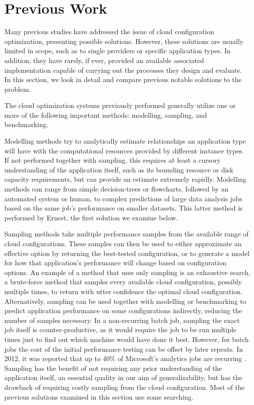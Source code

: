 \documentclass{report}
\begin{document}
\section{Previous Work}
Many previous studies have addressed the issue of cloud configuration optimization, presenting possible solutions. However, these solutions are usually limited in scope, such as to single providers or specific application types. In addition, they have rarely, if ever, provided an available associated implementation capable of carrying out the processes they design and evaluate. In this section, we look in detail and compare previous notable solutions to the problem.

The cloud optimization systems previously performed generally utilize one or more of the following important methods: modelling, sampling, and benchmarking. 

Modelling methods try to analytically estimate relationships an application type will have with the computational resources provided by different instance types. If not performed together with sampling, this requires at least a cursory understanding of the application itself, such as its bounding resource or disk capacity requirements, but can provide an estimate extremely rapidly. Modelling methods can range from simple decision-trees or flowcharts, followed by an automated system or human, to complex predictions of large data analysis jobs based on the same job's performance on smaller datasets. This latter method is performed by Ernest\cite{Venkataraman2016}, the first solution we examine below.

Sampling methods take multiple performance samples from the available range of cloud configurations. These samples can then be used to either approximate an effective option by returning the best-tested configuration, or to generate a model for how that application's performance will change based on configuration options. An example of a method that uses only sampling is an exhaustive search, a brute-force method that samples every available cloud configuration, possibly multiple times, to return with utter confidence the optimal cloud configuration. Alternatively, sampling can be used together with modelling or benchmarking to predict application performance on some configurations indirectly, reducing the number of samples necessary.
In a non-recurring batch job, sampling the exact job itself is counter-productive, as it would require the job to be run multiple times just to find out which machine would have done it best. However, for batch jobs the cost of the initial performance testing can be offset by later repeats. In 2012, it was reported that up to 40\% of Microsoft's analytics jobs are recurring \cite{Agarwal2012,Ferguson2012b}. Sampling has the benefit of not requiring any prior understanding of the application itself, an essential quality in our aim of generalizability, but has the drawback of requiring costly sampling from the cloud configuration. Most of the previous solutions examined in this section use some searching.
\end{document}
